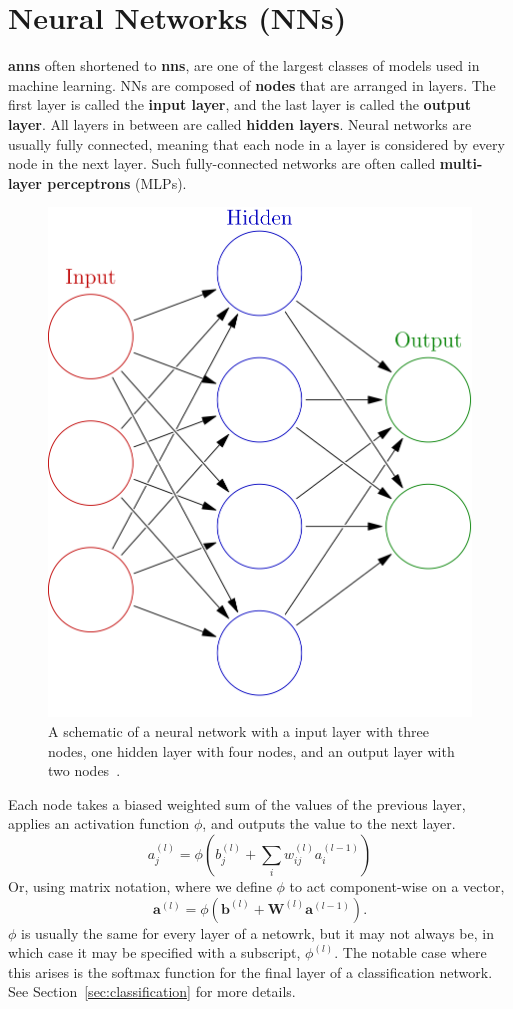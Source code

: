 \documentclass[12pt]{report}
\theoremstyle{definition}
\theoremstyle{remark}
\begin{document}
\section{Neural Networks (NNs)}\label{sec:nn}

\textbf{\Glspl{ann}} often shortened to \textbf{\glspl{nn}}, are one of the largest classes of models used in machine learning. NNs are composed of \textbf{\glspl{node}} that are arranged in layers. The first layer is called the \textbf{input layer}, and the last layer is called the \textbf{output layer}. All layers in between are called \textbf{hidden layers}. Neural networks are usually fully connected, meaning that each node in a layer is considered by every node in the next layer. Such fully-connected networks are often called \textbf{multi-layer perceptrons} (MLPs).

\begin{figure}[h]
    \centering
    \includegraphics[width=0.5\linewidth]{figs/colored_neural_network.png}
    \caption{A schematic of a neural network with a input layer with three nodes, one hidden layer with four nodes, and an output layer with two nodes~\cite{commons_filecolored_2025}.}
    \label{fig:enter-label}
\end{figure}

Each node takes a biased weighted sum of the values of the previous layer, applies an activation function $\phi$, and outputs the value to the next layer.
\begin{equation} \label{eq:node}
    a^{(l)}_j = \phi\left(b_j^{(l)} + \sum_i w_{ij}^{(l)} a_i^{(l-1)}\right)
\end{equation}
Or, using matrix notation, where we define $\phi$ to act component-wise on a vector,
\begin{equation}
    \mathbf{a}^{(l)} = \phi\left(\mathbf{b}^{(l)} + \mathbf{W}^{(l)}\mathbf{a}^{(l-1)}\right).
\end{equation}
$\phi$ is usually the same for every layer of a netowrk, but it may not always be, in which case it may be specified with a subscript, $\phi^{(l)}$. The notable case where this arises is the softmax function for the final layer of a classification network. See Section~\ref{sec:classification} for more details.
\end{document}
